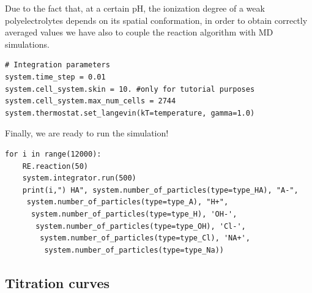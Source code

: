 \documentclass[
a4paper,                        %
11pt,                           %
twoside,                        %
footsepline,                    %
headsepline,                    %
headexclude,                    %
footexclude,                    %
pagesize,                       %
]{scrartcl}
\begin{document}
Due to the fact that, at a certain pH, the ionization degree of a weak polyelectrolytes depends on its spatial conformation, in order to obtain  correctly averaged values we have also to couple the reaction algorithm with MD simulations. 
\begin{verbatim}
# Integration parameters
system.time_step = 0.01
system.cell_system.skin = 10. #only for tutorial purposes 
system.cell_system.max_num_cells = 2744
system.thermostat.set_langevin(kT=temperature, gamma=1.0)
\end{verbatim}
Finally, we are ready to run the simulation!
\begin{verbatim}
for i in range(12000):
    RE.reaction(50)
    system.integrator.run(500) 
    print(i,") HA", system.number_of_particles(type=type_HA), "A-",
     system.number_of_particles(type=type_A), "H+",
      system.number_of_particles(type=type_H), 'OH-',
       system.number_of_particles(type=type_OH), 'Cl-',
        system.number_of_particles(type=type_Cl), 'NA+',
         system.number_of_particles(type=type_Na))
\end{verbatim}



\subsection{Titration curves}
\end{document}
